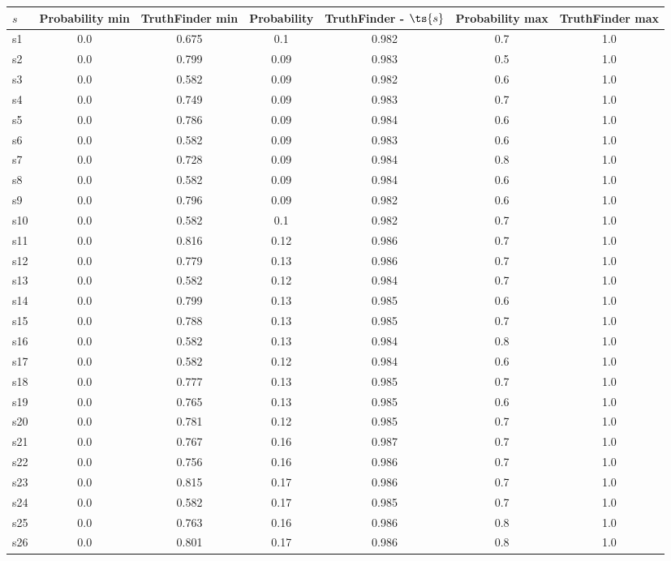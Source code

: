 \documentclass{article}
\begin{document}
\noindent\begin{tabular}{|l|c|c|c|c|c|c|}
\hline
$s$& Probability min & TruthFinder min & Probability & TruthFinder - $\ts{s}$ & Probability max & TruthFinder max\\
\hline
s1 &0.0 & 0.675 & 0.1 & 0.982 & 0.7 & 1.0\\
\hline
s2 &0.0 & 0.799 & 0.09 & 0.983 & 0.5 & 1.0\\
\hline
s3 &0.0 & 0.582 & 0.09 & 0.982 & 0.6 & 1.0\\
\hline
s4 &0.0 & 0.749 & 0.09 & 0.983 & 0.7 & 1.0\\
\hline
s5 &0.0 & 0.786 & 0.09 & 0.984 & 0.6 & 1.0\\
\hline
s6 &0.0 & 0.582 & 0.09 & 0.983 & 0.6 & 1.0\\
\hline
s7 &0.0 & 0.728 & 0.09 & 0.984 & 0.8 & 1.0\\
\hline
s8 &0.0 & 0.582 & 0.09 & 0.984 & 0.6 & 1.0\\
\hline
s9 &0.0 & 0.796 & 0.09 & 0.982 & 0.6 & 1.0\\
\hline
s10 &0.0 & 0.582 & 0.1 & 0.982 & 0.7 & 1.0\\
\hline
s11 &0.0 & 0.816 & 0.12 & 0.986 & 0.7 & 1.0\\
\hline
s12 &0.0 & 0.779 & 0.13 & 0.986 & 0.7 & 1.0\\
\hline
s13 &0.0 & 0.582 & 0.12 & 0.984 & 0.7 & 1.0\\
\hline
s14 &0.0 & 0.799 & 0.13 & 0.985 & 0.6 & 1.0\\
\hline
s15 &0.0 & 0.788 & 0.13 & 0.985 & 0.7 & 1.0\\
\hline
s16 &0.0 & 0.582 & 0.13 & 0.984 & 0.8 & 1.0\\
\hline
s17 &0.0 & 0.582 & 0.12 & 0.984 & 0.6 & 1.0\\
\hline
s18 &0.0 & 0.777 & 0.13 & 0.985 & 0.7 & 1.0\\
\hline
s19 &0.0 & 0.765 & 0.13 & 0.985 & 0.6 & 1.0\\
\hline
s20 &0.0 & 0.781 & 0.12 & 0.985 & 0.7 & 1.0\\
\hline
s21 &0.0 & 0.767 & 0.16 & 0.987 & 0.7 & 1.0\\
\hline
s22 &0.0 & 0.756 & 0.16 & 0.986 & 0.7 & 1.0\\
\hline
s23 &0.0 & 0.815 & 0.17 & 0.986 & 0.7 & 1.0\\
\hline
s24 &0.0 & 0.582 & 0.17 & 0.985 & 0.7 & 1.0\\
\hline
s25 &0.0 & 0.763 & 0.16 & 0.986 & 0.8 & 1.0\\
\hline
s26 &0.0 & 0.801 & 0.17 & 0.986 & 0.8 & 1.0\\

\end{tabular}
\end{document}
